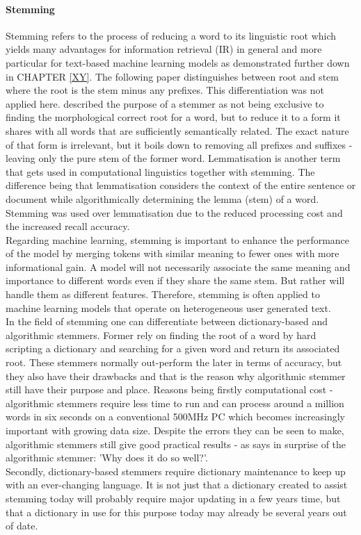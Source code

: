 \paragraph*{Stemming} \label{word_stemming}
Stemming refers to the process of reducing a word to its linguistic root which yields many advantages for information retrieval (IR) in general and more particular for text-based machine learning models as demonstrated further down in CHAPTER \ref{XY}. The following paper \parencite{Lovins1968} distinguishes between root and stem where the root is the stem minus any prefixes. This differentiation was not applied here. 
\parencite{Weissweiler2018} described the purpose of a stemmer as not being exclusive to finding the morphological correct root for a word, but to reduce it to a form it shares with all words that are sufficiently semantically related. The exact nature of that form is irrelevant, but it boils down to removing all prefixes and suffixes - leaving only the pure stem of the former word. Lemmatisation is another term that gets used in computational linguistics together with stemming. The difference being that lemmatisation considers the context of the entire sentence or document while algorithmically determining the lemma (stem) of a word. Stemming was used over lemmatisation due to the reduced processing cost and the increased recall accuracy.\\
\newline
Regarding machine learning, stemming is important to enhance the performance of the model by merging tokens with similar meaning to fewer ones with more informational gain. A model will not necessarily associate the same meaning and importance to different words even if they share the same stem. But rather will handle them as different features. Therefore, stemming is often applied to machine learning models that operate on heterogeneous user generated text.\\
\newline
In the field of stemming one can differentiate between dictionary-based and algorithmic stemmers. Former rely on finding the root of a word by hard scripting a dictionary and searching for a given word and return its associated root. These stemmers normally out-perform the later in terms of accuracy, but they also have their drawbacks and that is the reason why algorithmic stemmer still have their purpose and place.  Reasons being firstly computational cost - algorithmic stemmers require less time to run and can process around a million words in six seconds on a conventional 500MHz PC \parencite{Porter2001} which becomes increasingly important with growing data size. Despite the errors they can be seen to make, algorithmic stemmers still give good practical results - as \parencite{Krovetz1995} says in surprise of the algorithmic stemmer: 'Why does it do so well?'.\\ Secondly, dictionary-based stemmers require dictionary maintenance to keep up with an ever-changing language. It is not just that a dictionary created to assist stemming today will probably require major updating in a few years time, but that a dictionary in use for this purpose today may already be several years out of date.\\
